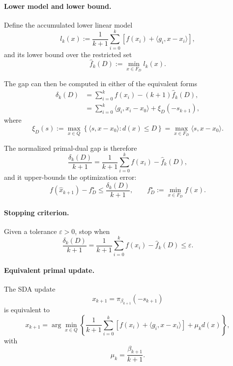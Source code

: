 \documentclass[12pt,a4paper]{article}
\begin{document}
\paragraph{Lower model and lower bound.}
Define the accumulated lower linear model
\begin{equation}
    l_k(x) := \frac{1}{k+1}\sum_{i=0}^k
    \left[f(x_i) + \langle g_i, x-x_i\rangle\right],
\end{equation}
and its lower bound over the restricted set
\begin{equation}
    \hat f_k(D) := \min_{x\in F_D} l_k(x).
\end{equation}

The gap can then be computed in either of the equivalent forms
\begin{align}
    \delta_k(D)
    &= \sum_{i=0}^k f(x_i) - (k+1)\hat f_k(D), \\
    &= \sum_{i=0}^k \langle g_i, x_i-x_0\rangle + \xi_D(-s_{k+1}),
\end{align}
where
\begin{equation}
    \xi_D(s) := \max_{x\in Q}\left\{\langle s, x-x_0\rangle : d(x)\le D\right\}
    = \max_{x\in F_D}\langle s, x-x_0\rangle.
\end{equation}

The normalized primal-dual gap is therefore
\begin{equation}
    \frac{\delta_k(D)}{k+1}
    = \frac{1}{k+1}\sum_{i=0}^k f(x_i) - \hat f_k(D),
\end{equation}
and it upper-bounds the optimization error:
\begin{equation}
    f(\hat x_{k+1}) - f_D^\star
    \le
    \frac{\delta_k(D)}{k+1},
    \qquad
    f_D^\star := \min_{x\in F_D} f(x).
\end{equation}

\paragraph{Stopping criterion.}
Given a tolerance \(\varepsilon>0\), stop when
\begin{equation}
    \frac{\delta_k(D)}{k+1}
    =
    \frac{1}{k+1}\sum_{i=0}^k f(x_i) - \hat f_k(D)
    \le \varepsilon.
    \label{eq:main-stopping}
\end{equation}

\paragraph{Equivalent primal update.}
The SDA update
\begin{equation}
    x_{k+1} = \pi_{\beta_{k+1}}(-s_{k+1})
\end{equation}
is equivalent to
\begin{equation}
    x_{k+1}
    =
    \arg\min_{x\in Q}
    \left\{
        \frac{1}{k+1}\sum_{i=0}^k
        \left[f(x_i)+\langle g_i, x-x_i\rangle\right]
        + \mu_k d(x)
    \right\},
\end{equation}
with
\begin{equation}
    \mu_k = \frac{\beta_{k+1}}{k+1}.
\end{equation}
\end{document}
